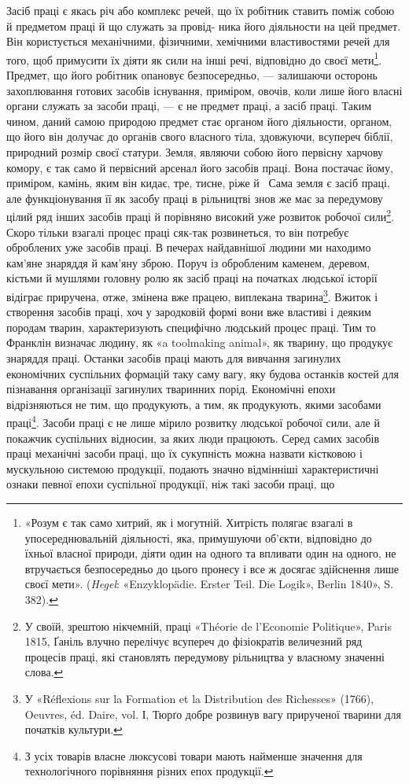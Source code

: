 Засіб праці є якась річ або комплекс речей, що їх робітник
ставить поміж собою й предметом праці й що служать за провід-
\parbreak{}
ника його діяльности на цей предмет. Він користується механічними,
фізичними, хемічними властивостями речей для того, щоб
примусити їх діяти як сили на інші речі, відповідно до своєї мети\footnote{
«Розум є так само хитрий, як і могутній. Хитрість полягає взагалі
в упосереднювальній діяльності, яка, примушуючи об’єкти, відповідно
до їхньої власної природи, діяти один на одного та впливати один на
одного, не втручається безпосередньо до цього пронесу і все ж досягає
здійснення лише своєї мети». (\emph{Hegel}: «Enzyklopädie. Erster Teil. Die
Logik», Berlin 1840», S. 382).
}.
Предмет, що його робітник опановує безпосередньо, — залишаючи
осторонь захоплювання готових засобів існування, приміром,
овочів, коли лише його власні органи служать за засоби праці, —
є не предмет праці, а засіб праці. Таким чином, даний самою
природою предмет стає органом його діяльности, органом, що
його він долучає до органів свого власного тіла, здовжуючи,
всупереч біблії, природний розмір своєї статури. Земля, являючи
собою його первісну харчову комору, є так само й первісний арсенал
його засобів праці. Вона постачає йому, приміром, камінь,
яким він кидає, тре, тисне, ріже й~ Сама земля є засіб праці,
але функціонування її як засобу праці в рільництві знов же
має за передумову цілий ряд інших засобів праці й порівняно
високий уже розвиток робочої сили\footnote{
У своїй, зрештою нікчемній, праці «Théorie de l’Economie Politique»,
Paris 1815, Ґаніль влучно перелічує всупереч до фізіократів величезний
ряд процесів праці, які становлять передумову рільництва у власному
значенні слова.
}. Скоро тільки взагалі процес
праці сяк-так розвинеться, то він потребує оброблених уже засобів
праці. В печерах найдавнішої людини ми находимо кам’яне
знаряддя й кам’яну зброю. Поруч із обробленим каменем, деревом,
кістьми й мушлями головну ролю як засіб праці на початках
людської історії відіграє приручена, отже, змінена вже працею,
виплекана тварина\footnote{
У «Réflexions sur la Formation et la Distribution des Richesses»
(1766), Oeuvres, éd. Daire, vol. І, Тюрґо добре розвинув вагу прирученої
тварини для початків культури.
}. Вжиток і створення засобів праці,
хоч у зародковій формі вони вже властиві і деяким породам тварин,
характеризують специфічно людський процес праці. Тим
то Франклін визначає людину, як «a toolmaking animal», як
тварину, що продукує знаряддя праці. Останки засобів праці
мають для вивчання загинулих економічних суспільних формацій
таку саму вагу, яку будова останків костей для пізнавання організації
загинулих тваринних порід. Економічні епохи відрізняються
не тим, що продукують, а тим, як продукують, якими
засобами праці\footnote{
З усіх товарів власне люксусові товари мають найменше значення
для технологічного порівняння різних епох продукції.
}. Засоби праці є не лише мірило розвитку людської
робочої сили, але й покажчик суспільних відносин, за яких
люди працюють. Серед самих засобів праці механічні засоби праці,
що їх сукупність можна назвати кістковою і мускульною системою
продукції, подають значно відмінніші характеристичні ознаки
певної епохи суспільної продукції, ніж такі засоби праці, що
\parbreak{}  %
